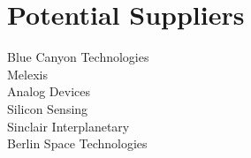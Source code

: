 \documentclass[english]{article}
\begin{document}
\section{Potential Suppliers}
Blue Canyon Technologies\\
Melexis\\
Analog Devices\\
Silicon Sensing\\
Sinclair Interplanetary\\
Berlin Space Technologies\\



\end{document}
